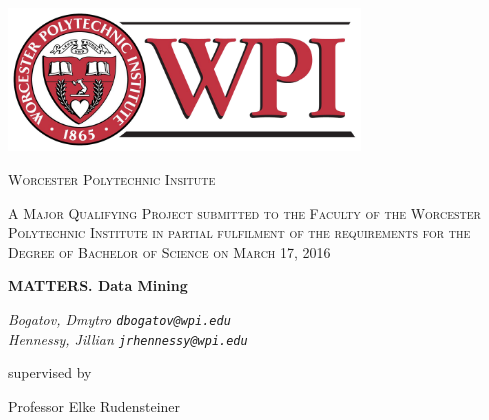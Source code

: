 \begin{titlepage}
	\centering
	
    \includegraphics[width=0.7\textwidth]{images/wpiLogo.png}\par\vspace{1cm}
	
    {\scshape\LARGE Worcester Polytechnic Insitute \par}
	\vspace{1cm}
	
    {\scshape\Large A Major Qualifying Project submitted to the Faculty of the Worcester Polytechnic Institute in partial fulfilment of the requirements for the Degree of Bachelor of Science on March 17, 2016 \par}
	\vspace{1.25cm}
	
    {\huge\bfseries MATTERS. Data Mining \par}
	\vspace{1cm}
	
    {\Large\itshape 
        Bogatov, Dmytro \texttt{dbogatov@wpi.edu} \\
        Hennessy, Jillian \texttt{jrhennessy@wpi.edu}
     \par}
	\vfill
	
    supervised by\par
	Professor Elke Rudensteiner

	\vfill
    
\end{titlepage}